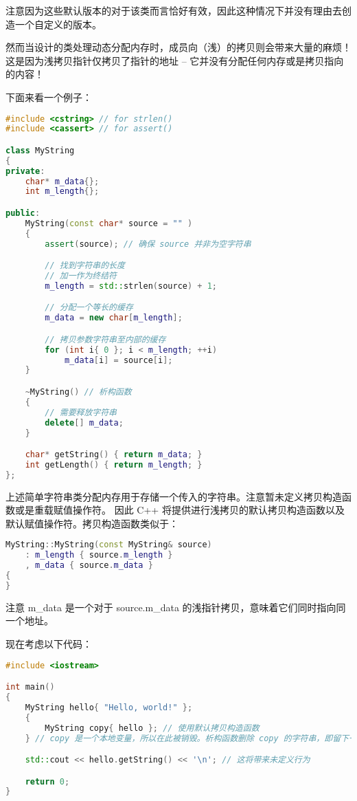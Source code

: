 \documentclass[../../LearnCpp.tex]{subfiles}
\begin{document}
注意因为这些默认版本的对于该类而言恰好有效，因此这种情况下并没有理由去创造一个自定义的版本。

然而当设计的类处理动态分配内存时，成员向（浅）的拷贝则会带来大量的麻烦！这是因为浅拷贝指针仅拷贝了指针的地址 --
它并没有分配任何内存或是拷贝指向的内容！

下面来看一个例子：

\begin{lstlisting}[language=C++]
#include <cstring> // for strlen()
#include <cassert> // for assert()

class MyString
{
private:
    char* m_data{};
    int m_length{};

public:
    MyString(const char* source = "" )
    {
        assert(source); // 确保 source 并非为空字符串

        // 找到字符串的长度
        // 加一作为终结符
        m_length = std::strlen(source) + 1;

        // 分配一个等长的缓存
        m_data = new char[m_length];

        // 拷贝参数字符串至内部的缓存
        for (int i{ 0 }; i < m_length; ++i)
            m_data[i] = source[i];
    }

    ~MyString() // 析构函数
    {
        // 需要释放字符串
        delete[] m_data;
    }

    char* getString() { return m_data; }
    int getLength() { return m_length; }
};
\end{lstlisting}

上述简单字符串类分配内存用于存储一个传入的字符串。注意暂未定义拷贝构造函数或是重载赋值操作符。
因此 C++ 将提供进行浅拷贝的默认拷贝构造函数以及默认赋值操作符。拷贝构造函数类似于：

\begin{lstlisting}[language=C++]
MyString::MyString(const MyString& source)
    : m_length { source.m_length }
    , m_data { source.m_data }
{
}
\end{lstlisting}

注意 m\_data 是一个对于 source.m\_data 的浅指针拷贝，意味着它们同时指向同一个地址。

现在考虑以下代码：

\begin{lstlisting}[language=C++]
#include <iostream>

int main()
{
    MyString hello{ "Hello, world!" };
    {
        MyString copy{ hello }; // 使用默认拷贝构造函数
    } // copy 是一个本地变量，所以在此被销毁。析构函数删除 copy 的字符串，即留下一个悬垂指针

    std::cout << hello.getString() << '\n'; // 这将带来未定义行为

    return 0;
}
\end{lstlisting}
\end{document}
